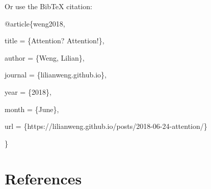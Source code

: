 \documentclass[12pt]{article}
\begin{document}
Or use the BibTeX citation:

\begin{tcolorbox}[
    colback=black!5!white,
    colframe=black!80!white,
    boxrule=0.5pt,
    arc=2mm,
    left=1mm,
    right=1mm,
    top=1mm,
    bottom=1mm,
    listing only,
    listing options={
      basicstyle=\ttfamily\footnotesize,
      breaklines=true,
      literate={\{}{{\char`\{}}1 {\}}{{\char`\}}}1
    }
  ]
  @article\{weng2018,

    title   = \{Attention? Attention!\},

    author  = \{Weng, Lilian\},

    journal = \{lilianweng.github.io\},

    year    = \{2018\},

    month   = \{June\},

    url     = \{https://lilianweng.github.io/posts/2018-06-24-attention/\}

  \}
\end{tcolorbox}

\section*{References}
\end{document}
